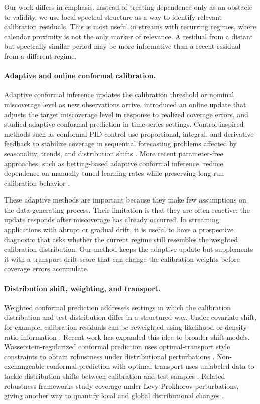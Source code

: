 \documentclass[11pt]{article}
\begin{document}
Our work differs in emphasis. Instead of treating dependence only as an obstacle to validity, we use local spectral structure as a way to identify relevant calibration residuals. This is most useful in streams with recurring regimes, where calendar proximity is not the only marker of relevance. A residual from a distant but spectrally similar period may be more informative than a recent residual from a different regime.

\paragraph{Adaptive and online conformal calibration.}
Adaptive conformal inference updates the calibration threshold or nominal miscoverage level as new observations arrive. \citet{gibbs2021adaptive} introduced an online update that adjusts the target miscoverage level in response to realized coverage errors, and \citet{zaffran2022adaptive} studied adaptive conformal prediction in time-series settings. Control-inspired methods such as conformal PID control use proportional, integral, and derivative feedback to stabilize coverage in sequential forecasting problems affected by seasonality, trends, and distribution shifts \citep{angelopoulos2023pid}. More recent parameter-free approaches, such as betting-based adaptive conformal inference, reduce dependence on manually tuned learning rates while preserving long-run calibration behavior \citep{bastani2024betting}.

These adaptive methods are important because they make few assumptions on the data-generating process. Their limitation is that they are often reactive: the update responds after miscoverage has already occurred. In streaming applications with abrupt or gradual drift, it is useful to have a prospective diagnostic that asks whether the current regime still resembles the weighted calibration distribution. Our method keeps the adaptive update but supplements it with a transport drift score that can change the calibration weights before coverage errors accumulate.

\paragraph{Distribution shift, weighting, and transport.}
Weighted conformal prediction addresses settings in which the calibration distribution and test distribution differ in a structured way. Under covariate shift, for example, calibration residuals can be reweighted using likelihood or density-ratio information \citep{tibshirani2019conformal}. Recent work has expanded this idea to broader shift models. Wasserstein-regularized conformal prediction uses optimal-transport style constraints to obtain robustness under distributional perturbations \citep{xu2025wasserstein}. Non-exchangeable conformal prediction with optimal transport uses unlabeled data to tackle distribution shifts between calibration and test samples \citep{correia2025optimal}. Related robustness frameworks study coverage under Levy-Prokhorov perturbations, giving another way to quantify local and global distributional changes \citep{aolaritei2025levy}.
\end{document}
